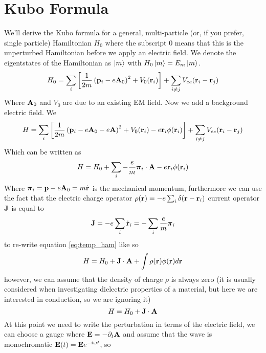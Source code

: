 \section{Kubo Formula}
We'll derive the Kubo formula for a general, multi-particle (or, if you prefer, single particle) Hamiltonian $H_0$ where the subscript 0 means that this is the unperturbed Hamiltonian before we apply an electric field. We denote the eigentstates of the Hamiltonian as $\ket m$ with $H_0\ket m=E_m \ket m$.
\begin{equation}
    H_0=\sum_i\left[\frac{1}{2m}\left(\mathbf{p}_i-e\mathbf{A}_0\right)^2 + V_0(\mathbf{r}_i)\right]+\sum_{i\neq j}V_{ee}(\mathbf{r}_i-\mathbf{r}_j)
\end{equation}
Where $\mathbf{A}_0$ and $V_0$ are due to an existing EM field. Now we add a background electric field. We 
\begin{equation}
    H=\sum_i\left[\frac{1}{2m}\left(\mathbf{p}_i-e\mathbf{A}_0 - e\mathbf{A}\right)^2 + V_0(\mathbf{r}_i) - e\mathbf{r}_i\phi(\mathbf{r}_i)\right]+\sum_{i\neq j}V_{ee}(\mathbf{r}_i-\mathbf{r}_j)
\end{equation}
Which can be written as 
\begin{equation}
    H=H_0 + \sum_{i}-\frac{e}m \boldsymbol \pi_i\cdot \mathbf{A} - e\mathbf{r}_i\phi(\mathbf{r}_i)
    \label{eq:temp_ham}
\end{equation}
Where $\boldsymbol \pi_i=\mathbf{p} -e\mathbf{A}_0=m\dot{\mathbf{r}}$ is the mechanical momentum,
furthermore we can use the fact that the electric charge operator $\rho(\mathbf{r})=-e\sum_{i}\delta(\mathbf{r}-\mathbf{r}_i)$ current operator  $\mathbf{J}$ is equal to 
\begin{equation}
    \mathbf{J}=-e\sum_{i}\dot{\mathbf{r}}_i=-\sum_{i}\frac{e}m \boldsymbol \pi_i
\end{equation}
to re-write equation \ref{eq:temp_ham} like so
\begin{equation}
    H=H_0+\mathbf{J}\cdot \mathbf{A} + \int\rho(\mathbf{r})\phi(\mathbf{r})d\mathbf{r}
\end{equation}
however, we can assume that the density of charge $\rho$ is always zero (it is usually considered when investigating dielectric properties of a material, but here we are interested in conduction, so we are ignoring it)
\begin{equation}
    H=H_0+\mathbf{J}\cdot \mathbf{A}
    \label{eq:deltaH}
\end{equation}
At this point we need to write the perturbation in terms of the electric field, we can choose a gauge where $\mathbf{E}=-\partial_t\mathbf{A}$ and assume that the wave is monochromatic $\mathbf{E}(t)=\mathbf{E}e^{-i\omega t}$, so 
